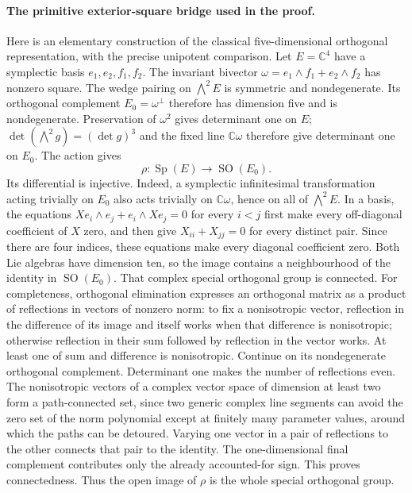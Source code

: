 \paragraph{The primitive exterior-square bridge used in the proof.}
Here is an elementary construction of the classical five-dimensional
orthogonal representation, with the precise unipotent comparison.
Let $E=\mathbb C^4$ have a symplectic basis $e_1,e_2,f_1,f_2$.
The invariant bivector $\omega=e_1\wedge f_1+e_2\wedge f_2$ has
nonzero square. The wedge pairing on $\bigwedge^2E$ is symmetric
and nondegenerate. Its orthogonal complement
$E_0=\omega^\perp$ therefore has dimension five and is nondegenerate.
Preservation of $\omega^2$ gives determinant one on $E$;
$\det(\bigwedge^2g)=(\det g)^3$ and the fixed line
$\mathbb C\omega$ therefore give determinant one on $E_0$.
The action gives
\[
 \rho:\operatorname{Sp}(E)\longrightarrow\operatorname{SO}(E_0).
\]
Its differential is injective. Indeed, a symplectic infinitesimal
transformation acting trivially on $E_0$ also acts trivially on
$\mathbb C\omega$, hence on all of $\bigwedge^2E$. In a basis,
the equations $Xe_i\wedge e_j+e_i\wedge Xe_j=0$ for every $i<j$
first make every off-diagonal coefficient of $X$ zero, and then give
$X_{ii}+X_{jj}=0$ for every distinct pair. Since there are four
indices, these equations make every diagonal coefficient zero.
Both Lie algebras have dimension ten, so the image contains a
neighbourhood of the identity in $\operatorname{SO}(E_0)$.
That complex special orthogonal group is connected. For completeness,
orthogonal elimination expresses an orthogonal matrix as a product
of reflections in vectors of nonzero norm: to fix a nonisotropic
vector, reflection in the difference of its image and itself works
when that difference is nonisotropic; otherwise reflection in their
sum followed by reflection in the vector works. At least one of
sum and difference is nonisotropic. Continue on its nondegenerate
orthogonal complement. Determinant one makes the number of
reflections even. The nonisotropic vectors of a complex vector
space of dimension at least two form a path-connected set, since
two generic complex line segments can avoid the zero set of the
norm polynomial except at finitely many parameter values, around
which the paths can be detoured. Varying one vector in a pair of
reflections to the other connects that pair to the identity.
The one-dimensional final complement contributes only the already
accounted-for sign. This proves connectedness. Thus the open image
of $\rho$ is the whole special orthogonal group.


